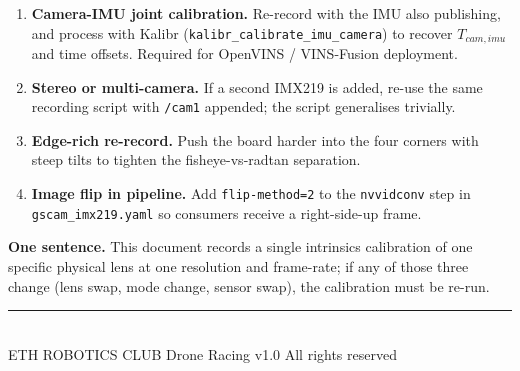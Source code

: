 \documentclass[11pt,a4paper]{article}
\begin{document}
\begin{enumerate}[leftmargin=18pt, itemsep=4pt]
\item \textbf{Camera-IMU joint calibration.} Re-record with the IMU also publishing, and process with Kalibr (\texttt{kalibr\_calibrate\_imu\_camera}) to recover $T_{cam,imu}$ and time offsets. Required for OpenVINS / VINS-Fusion deployment.
\item \textbf{Stereo or multi-camera.} If a second IMX219 is added, re-use the same recording script with \texttt{/cam1} appended; the script generalises trivially.
\item \textbf{Edge-rich re-record.} Push the board harder into the four corners with steep tilts to tighten the fisheye-vs-radtan separation.
\item \textbf{Image flip in pipeline.} Add \texttt{flip-method=2} to the \texttt{nvvidconv} step in \texttt{gscam\_imx219.yaml} so consumers receive a right-side-up frame.
\end{enumerate}

\vspace{20pt}

\begin{pillar}
\textbf{One sentence.}  This document records a single intrinsics calibration of one specific physical lens at one resolution and frame-rate; if any of those three change (lens swap, mode change, sensor swap), the calibration must be re-run.
\end{pillar}

\vfill
\noindent
\textcolor{ethMuted}{\sffamily\footnotesize
\textcolor{ethRule}{\rule{\linewidth}{0.4pt}}\\[6pt]
ETH ROBOTICS CLUB  \quad\textbar\quad  Drone Racing  \quad\textbar\quad  v1.0  \quad\textbar\quad  All rights reserved}
\end{document}

